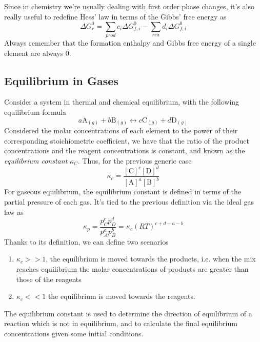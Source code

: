 \documentclass[../qm.tex]{subfiles}
\begin{document}
Since in chemistry we're usually dealing with first order phase changes, it's also really useful to redefine Hess' law in terms of the Gibbs' free energy as
\begin{equation}
	\Delta G^0_r=\sum_{prod}c_i\Delta G_{f, i}^0-\sum_{rea}d_i\Delta G^0_{f, i}
	\label{eq:hessgibbs.tch}
\end{equation}
Always remember that the formation enthalpy and Gibbs free energy of a single element are always 0.
\subsection{Equilibrium in Gases}
Consider a system in thermal and chemical equilibrium, with the following equilibrium formula
\begin{equation}
	a\mathrm{A}_{(g)}+b\mathrm{B}_{(g)}\longleftrightarrow c\mathrm{C}_{(g)}+d\mathrm{D}_{(g)}
	\label{eq:chemeq.chem}
\end{equation}
Considered the molar concentrations of each element to the power of their corresponding stoichiometric coefficient, we have that the ratio of the product concentrations and the reagent concentrations is constant, and known as the \emph{equilibrium constant} $\kappa_C$. Thus, for the previous generic case 
\begin{equation}
	\kappa_{c}=\frac{\left[ \mathrm{C} \right]^c\left[ \mathrm{D} \right]^d}{\left[ \mathrm{A} \right]^a\left[ \mathrm{B} \right]^b}
	\label{eq:kappac.tch}
\end{equation}
For gaseous equilibrium, the equilibrium constant is defined in terms of the partial pressure of each gas. It's tied to the previous definition via the ideal gas law as 
\begin{equation}
	\kappa_p=\frac{p_C^cp_D^d}{p_A^ap_B^b}=\kappa_c\left( RT \right)^{c+d-a-b}
\label{eq:kckprel.tch}
\end{equation}
Thanks to its definition, we can define two scenarios
\begin{enumerate}
\item $\kappa_c>>1$, the equilibrium is moved towards the products, i.e. when the mix reaches equilibrium the molar concentrations of products are greater than those of the reagents
\item $\kappa_c<<1$ the equilibrium is moved towards the reagents.
\end{enumerate}
The equilibrium constant is used to determine the direction of equilibrium of a reaction which is not in equilibrium, and to calculate the final equilibrium concentrations given some initial conditions.\\
\end{document}
